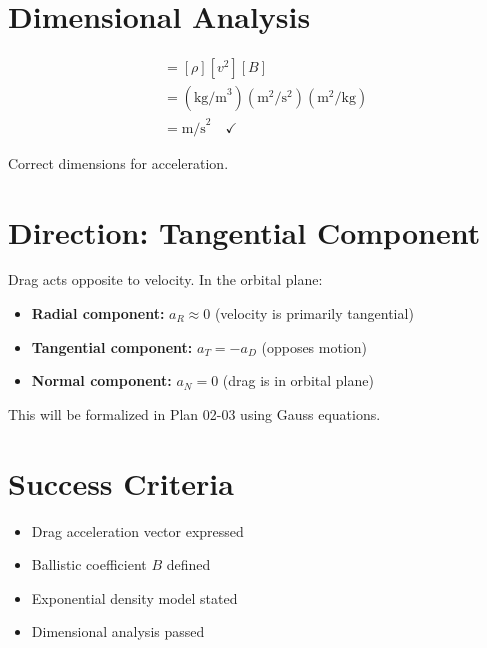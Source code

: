 \documentclass[11pt]{article}
\begin{document}
\section{Dimensional Analysis}

\begin{align}
[a_D] &= [\rho][v^2][B]\\
&= (\text{kg/m}^3)(\text{m}^2/\text{s}^2)(\text{m}^2/\text{kg})\\
&= \text{m/s}^2 \quad \checkmark
\end{align}

Correct dimensions for acceleration.

\section{Direction: Tangential Component}

Drag acts opposite to velocity. In the orbital plane:
\begin{itemize}
    \item \textbf{Radial component:} $a_R \approx 0$ (velocity is primarily tangential)
    \item \textbf{Tangential component:} $a_T = -a_D$ (opposes motion)
    \item \textbf{Normal component:} $a_N = 0$ (drag is in orbital plane)
\end{itemize}

This will be formalized in Plan 02-03 using Gauss equations.

\section{Success Criteria}
\begin{itemize}
    \item[$\checkmark$] Drag acceleration vector expressed
    \item[$\checkmark$] Ballistic coefficient $B$ defined
    \item[$\checkmark$] Exponential density model stated
    \item[$\checkmark$] Dimensional analysis passed
\end{itemize}
\end{document}
